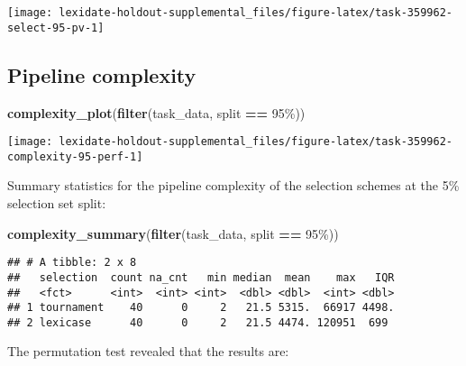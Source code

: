 \documentclass[
]{book}
\newenvironment{Shaded}{\begin{snugshade}}{\end{snugshade}}
\newcommand{\FunctionTok}[1]{\textcolor[rgb]{0.13,0.29,0.53}{\textbf{#1}}}
\newcommand{\NormalTok}[1]{#1}
\newcommand{\SpecialCharTok}[1]{\textcolor[rgb]{0.81,0.36,0.00}{\textbf{#1}}}
\newcommand{\StringTok}[1]{\textcolor[rgb]{0.31,0.60,0.02}{#1}}
\begin{document}
\texttt{[image: lexidate-holdout-supplemental\_files/figure-latex/task-359962-select-95-pv-1]}

\hypertarget{pipeline-complexity-52}{%
\subsection{Pipeline complexity}\label{pipeline-complexity-52}}

\begin{Shaded}
\begin{Highlighting}[]
\FunctionTok{complexity\_plot}\NormalTok{(}\FunctionTok{filter}\NormalTok{(task\_data, split }\SpecialCharTok{==} \StringTok{\textquotesingle{}95\%\textquotesingle{}}\NormalTok{))}
\end{Highlighting}
\end{Shaded}

\texttt{[image: lexidate-holdout-supplemental\_files/figure-latex/task-359962-complexity-95-perf-1]}

Summary statistics for the pipeline complexity of the selection schemes at the 5\% selection set split:

\begin{Shaded}
\begin{Highlighting}[]
\FunctionTok{complexity\_summary}\NormalTok{(}\FunctionTok{filter}\NormalTok{(task\_data, split }\SpecialCharTok{==} \StringTok{\textquotesingle{}95\%\textquotesingle{}}\NormalTok{))}
\end{Highlighting}
\end{Shaded}

\begin{verbatim}
## # A tibble: 2 x 8
##   selection  count na_cnt   min median  mean    max   IQR
##   <fct>      <int>  <int> <int>  <dbl> <dbl>  <int> <dbl>
## 1 tournament    40      0     2   21.5 5315.  66917 4498.
## 2 lexicase      40      0     2   21.5 4474. 120951  699
\end{verbatim}

The permutation test revealed that the results are:
\end{document}
